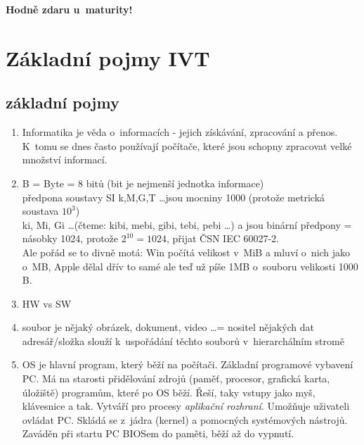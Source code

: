\documentclass[12pt]{article}
\begin{document}
\begin{center}
       \vspace{1.5cm}
		\begin{LARGE}
		\textbf{Hodně zdaru u~maturity!}
		\end{LARGE}
\end{center}

\newpage
{}
\section{Základní pojmy IVT}
\subsection{základní pojmy}
\begin{enumerate}
\item Informatika je věda o~informacích - jejich získávání, zpracování a přenos. K~tomu se dnes často používají počítače, které jsou schopny zpracovat velké množství informací.
\item B = Byte = 8 bitů (bit je nejmenší jednotka informace)\\
předpona soustavy SI k,M,G,T \dots jsou mocniny 1000 (protože metrická soustava $10^3$)\\
ki, Mi, Gi \dots (čteme: kibi, mebi, gibi, tebi, pebi \dots) a jsou binární předpony = násobky 1024, protože $2^{10} = 1024$, přijat ČSN IEC 60027-2.\\
Ale pořád se to divně motá: Win počítá velikost v~MiB a mluví o~nich jako o~MB, Apple dělal dřív to samé ale teď už píše 1MB o~souboru velikosti 1000 B. 
\item HW vs SW
\item soubor je nějaký obrázek, dokument, video \dots  = nositel nějakých dat\\
adresář/složka slouží k~uspořádání těchto souborů v~hierarchálním stromě
\item OS je hlavní program, který běží na počítači. Základní programové vybavení PC. Má na starosti přidělování zdrojů (paměť, procesor, grafická karta, úložiště) programům, které po OS běží. Řeší, taky vstupy jako myš, klávesnice a tak. Vytváří pro procesy \emph{aplikační rozhraní}. Umožňuje uživateli ovládat PC. Skládá se z~jádra (kernel) a pomocných systémových nástrojů. Zaváděn při startu PC BIOSem do paměti, běží až do vypnutí.
\end{enumerate}
\end{document}
